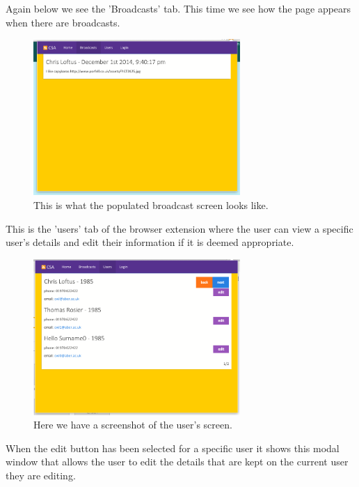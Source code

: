 \documentclass{article}
\begin{document}
Again below we see the 'Broadcasts' tab. This time we see how the page appears when there are broadcasts.

\begin{figure}[H]
\centering
\includegraphics[width=0.7\textwidth]{populatebcpage}
\caption{This is what the populated broadcast screen looks like.}
\end{figure}

This is the 'users' tab of the browser extension where the user can view a specific user's details and edit their information if it is deemed appropriate.

\begin{figure}[H]
\centering
\includegraphics[width=0.7\textwidth]{userpage}
\caption{Here we have a screenshot of the user's screen.}
\end{figure}

When the edit button has been selected for a specific user it shows this modal window that allows the user to edit the details that are kept on the current user they are editing.
\end{document}
